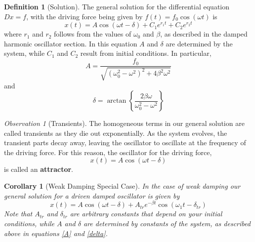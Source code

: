 \documentclass[12pt]{article}
\newtheorem{cor}[thm]{Corollary}
\theoremstyle{definition}
\newtheorem{defn}[thm]{Definition}
\theoremstyle{remark}
\newtheorem{obs}[thm]{Observation}
\numberwithin{equation}{section}
\newcommand\B[1]{\textbf{#1}}
\begin{document}
\begin{defn}[Solution]
        The general solution for the differential equation $Dx = f$, with the driving force being given by $f(t) = f_0\cos(\omega t)$ is \begin{equation}
                x(t) = A\cos(\omega t - \delta) + C_1e^{r_1t}+C_2e^{r_2t}
        \end{equation}
        where $r_1$ and $r_2$ follows from the values of $\omega_0$ and $\beta$, as described in the damped harmonic oscillator section. In this equation $A$ and $\delta$ are determined by the system, while $C_1$ and $C_2$ result from initial conditions. In particular, \begin{equation}
                A = \frac{f_0}{\sqrt{(\omega_0^2-\omega^2)^2+4\beta^2\omega^2}}\label{A}
        \end{equation}
        and \begin{equation}
                \delta = \arctan\left\{\frac{2\beta\omega}{\omega_0^2-\omega^2}\right\}\label{delta}
        \end{equation}
\end{defn}

\vspace{15pt}

\begin{obs}[Transients]
        The homogeneous terms in our general solution are called transients as they die out exponentially. As the system evolves, the transient parts decay away, leaving the oscillator to oscillate at the frequency of the driving force. For this reason, the oscillator for the driving force,\begin{equation}
                x(t) = A\cos(\omega t - \delta)
        \end{equation}
        is called an \B{attractor}.
\end{obs}

\vspace{15pt}

\begin{cor}[Weak Damping Special Case]
        In the case of weak damping our general solution for a driven damped oscillator is given by \begin{equation}
                x(t) = A\cos(\omega t - \delta) + A_{tr}e^{-\beta t}\cos(\omega_1 t - \delta_{tr})
        \end{equation}
        Note that $A_{tr}$ and $\delta_{tr}$ are arbitrary constants that depend on your initial conditions, while $A$ and $\delta$ are determined by constants of the system, as described above in equations \ref{A} and \ref{delta}.
\end{cor}
\end{document}

